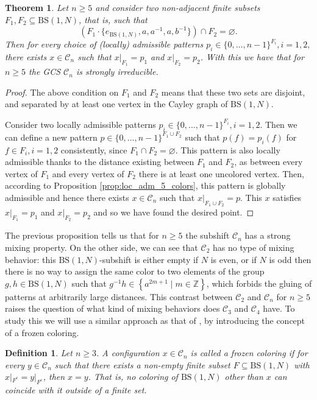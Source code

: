 \documentclass[cupthm,crop,info]{CUP-JNL-ETS}%
\theoremstyle{cupplain}
\newtheorem{theorem}{Theorem}[section]
\theoremstyle{cupdefinition}
\newtheorem{definition}{Definition}[section]
\theoremstyle{cupremark}
\theoremstyle{cupproof}
\newtheorem{proof}{Proof}
\numberwithin{equation}{section}
\newcommand{\BS}[1][N]{\mathrm{BS}(1,#1)}
\begin{document}
\begin{theorem}\label{thm:gcs_mixing_n5} Let $n\ge 5$ and consider two non-adjacent finite subsets $F_1,F_2\subseteq \BS$, that is, such that 
	$$\left( F_1\cdot \{e_{\BS},a,a^{-1},a,b^{-1}\}\right)\cap F_2=\varnothing.$$
	Then for every choice of (locally) admissible patterns $p_i\in \{0,\ldots,n-1\}^{F_i}, i=1,2,$ there exists $x\in \mathcal{C}_n$ such that $x|_{F_1}=p_1$ and $x|_{F_2}=p_2$. With this we have that for $n\ge 5$ the GCS $\mathcal{C}_n$ is strongly irreducible.
\end{theorem}
\begin{proof}
	The above condition on $F_1$ and $F_2$ means that these two sets are disjoint, and separated by at least one vertex in the Cayley graph of $\BS$. 

	Consider two locally admissible patterns $p_i\in \{0,\ldots,n-1\}^{F_i}, i=1,2$. Then we can define a new pattern $p\in \{0,\ldots,n-1\}^{F_1\cup F_2}$ such that $p(f)=p_i(f)$ for $f\in F_i, i=1,2$ consistently, since $F_1\cap F_2=\varnothing.$ This pattern is also locally admissible thanks to the distance existing between $F_1$ and $F_2$, as between every vertex of $F_1$ and every vertex of $F_2$ there is at least one uncolored vertex. Then, according to Proposition \ref{prop:loc_adm_5_colors}, this pattern is globally admissible and hence there exists $x\in \mathcal{C}_n$ such that $x|_{F_1\cup F_2}=p$. This $x$ satisfies $x|_{F_1}=p_1$ and $x|_{F_2}=p_2$ and so we have found the desired point.
\end{proof}


The previous proposition tells us that for $n\ge 5$ the subshift $\mathcal{C}_n$ has a strong mixing property. On the other side, we can see that $\mathcal{C}_2$ has no type of mixing behavior: this $\BS$-subshift is either empty if $N$ is even, or if $N$ is odd then there is no way to assign the same color to two elements of the group $g,h\in \BS$ such that $g^{-1}h\in \left\{a^{2m+1}\mid m\in \mathbb{Z} \right\}$, which forbids the gluing of patterns at arbitrarily large distances. This contrast between $\mathcal{C}_2$ and $\mathcal{C}_n$ for $n\ge 5$ raises the question of what kind of mixing behaviors does $\mathcal{C}_3$ and $\mathcal{C}_4$ have. To study this we will use a similar approach as that of \cite{alon2019mixing}, by introducing the concept of a frozen coloring.
\begin{definition} Let $n\ge 3$. A configuration $x\in \mathcal{C}_n$ is called a \textit{frozen coloring} if for every $y\in \mathcal{C}_n$ such that there exists a non-empty finite subset $F\subseteq \BS$ with $x|_{F^c}=y|_{F^c}$, then $x= y$. That is, no coloring of $\BS$ other than $x$ can coincide with it outside of a finite set.
\end{definition}
\end{document}
